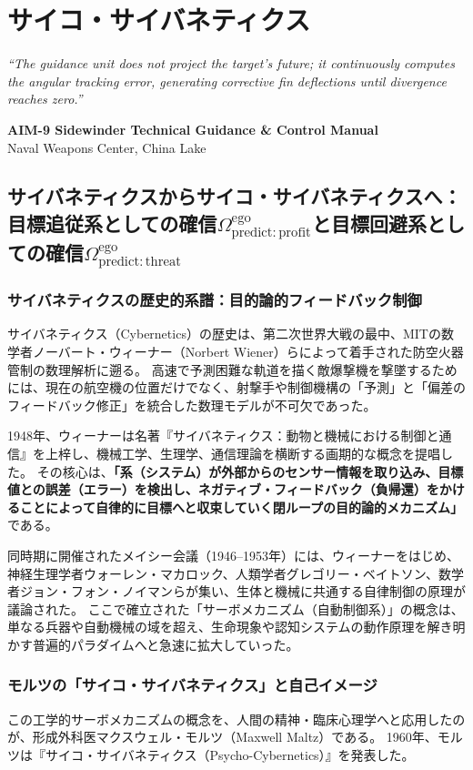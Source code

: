\chapter{サイコ・サイバネティクス}
\epigraph{%
  \itshape ``The guidance unit does not project the target's future;
  it continuously computes the angular tracking error,
  generating corrective fin deflections until divergence reaches zero.''
}{%
  \textbf{AIM-9 Sidewinder Technical Guidance \& Control Manual}\\
  Naval Weapons Center, China Lake
}
\section{サイバネティクスからサイコ・サイバネティクスへ：目標追従系としての確信$\Omega^{\mathrm{ego}}_{\mathrm{predict:profit}}$と目標回避系としての確信$\Omega^{\mathrm{ego}}_{\mathrm{predict:threat}}$}

\subsection{サイバネティクスの歴史的系譜：目的論的フィードバック制御}
サイバネティクス（Cybernetics）の歴史は、第二次世界大戦の最中、MITの数学者ノーバート・ウィーナー（Norbert Wiener）らによって着手された防空火器管制の数理解析に遡る。
高速で予測困難な軌道を描く敵爆撃機を撃墜するためには、現在の航空機の位置だけでなく、射撃手や制御機構の「予測」と「偏差のフィードバック修正」を統合した数理モデルが不可欠であった。

1948年、ウィーナーは名著『サイバネティクス：動物と機械における制御と通信』を上梓し、機械工学、生理学、通信理論を横断する画期的な概念を提唱した。
その核心は、\textbf{「系（システム）が外部からのセンサー情報を取り込み、目標値との誤差（エラー）を検出し、ネガティブ・フィードバック（負帰還）をかけることによって自律的に目標へと収束していく閉ループの目的論的メカニズム」}である。

同時期に開催されたメイシー会議（1946–1953年）には、ウィーナーをはじめ、神経生理学者ウォーレン・マカロック、人類学者グレゴリー・ベイトソン、数学者ジョン・フォン・ノイマンらが集い、生体と機械に共通する自律制御の原理が議論された。
ここで確立された「サーボメカニズム（自動制御系）」の概念は、単なる兵器や自動機械の域を超え、生命現象や認知システムの動作原理を解き明かす普遍的パラダイムへと急速に拡大していった。

\subsection{モルツの「サイコ・サイバネティクス」と自己イメージ}
この工学的サーボメカニズムの概念を、人間の精神・臨床心理学へと応用したのが、形成外科医マクスウェル・モルツ（Maxwell Maltz）である。
1960年、モルツは『サイコ・サイバネティクス（Psycho-Cybernetics）』を発表した。

